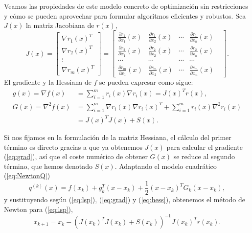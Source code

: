 \documentclass[11pt,a4paper]{book}
\theoremstyle{definition}
\theoremstyle{remark}
\begin{document}
Veamos las propiedades de este modelo concreto de optimización sin restricciones y cómo se pueden aprovechar para formular algoritmos eficientes y robustos.
Sea $J(x)$ la matriz Jacobiana de $r(x)$, 
\begin{equation}
	J(x) = 
	\begin{bmatrix}
		\nabla r_1(x)^T \\
		\nabla r_2(x)^T \\
		\vdots \\
		\nabla r_m(x)^T
	\end{bmatrix}
	=
	\begin{bmatrix}
		\frac{\partial r_1}{\partial x_1}(x) &
		\frac{\partial r_1}{\partial x_2}(x) &
		\cdots &
		\frac{\partial r_1}{\partial x_n}(x) \\
		
		\frac{\partial r_2}{\partial x_1}(x) &
		\frac{\partial r_2}{\partial x_2}(x) &
		\cdots &
		\frac{\partial r_2}{\partial x_n}(x) \\
		
		\cdots &
		\cdots &
		\cdots &
		\cdots & \\
		
		\frac{\partial r_m}{\partial x_1}(x) &
		\frac{\partial r_m}{\partial x_2}(x) &
		\cdots &
		\frac{\partial r_m}{\partial x_n}(x) 
	\end{bmatrix}.
\end{equation}
El gradiente y la Hessiana de $f$ se pueden expresar como sigue:
\begin{align}
	g(x) = \nabla f(x) &= \sum_{i=1}^m r_i(x) \nabla r_i(x) = J(x)^Tr(x), \label{eq:grad}\\
	G(x) = \nabla^2 f(x) &= \sum_{i=1}^m \nabla r_i(x) \nabla r_i(x)^T + \sum_{i=1}^m r_i(x)\nabla^2r_i(x) \nonumber \\
	&= J(x)^TJ(x)+S(x). \label{eq:hess}
\end{align}

Si nos fijamos en la formulación de la matriz Hessiana, el cálculo del primer término es directo
gracias a que ya obtenemos $J(x)$ para calcular el gradiente (\ref{eq:grad}), así que el coste numérico de obtener
$G(x)$ se reduce
al segundo término, que hemos denotado $S(x)$.
Adaptando el modelo cuadrático (\ref{eq:NewtonQ})
\begin{equation}
	q^{(k)}(x) = f(x_k) + g^T_k(x-x_k) + \frac{1}{2}(x-x_k)^TG_k(x-x_k),
	\label{eq:q}
\end{equation}
y sustituyendo según (\ref{eq:lsp}), (\ref{eq:grad}) y (\ref{eq:hess}), obtenemos el método de Newton para (\ref{eq:lsp}),
\begin{equation}
	x_{k+1} = x_k-(J(x_k)^TJ(x_k)+S(x_k))^{-1}J(x_k)^Tr(x_k).
	\label{eq:newtoniter}
\end{equation}
\end{document}
